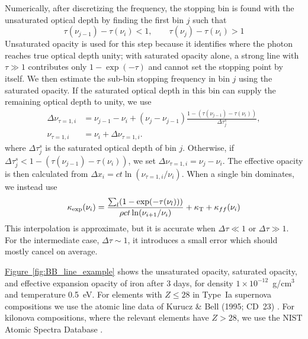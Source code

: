 \documentclass[final,5p,times,twocolumn]{elsarticle}
\DeclareRobustCommand{\figref}[1]{\hyperref[#1]{Figure~\ref*{#1}}}
\begin{document}
    Numerically, after discretizing the frequency, the stopping bin is found with the unsaturated
    optical depth by finding the first bin $j$ such that
    \begin{equation}
        \tau(\nu_{j-1}) - \tau(\nu_i) < 1,
        \qquad
        \tau(\nu_j) - \tau(\nu_i) > 1
    \end{equation}
    Unsaturated opacity is used for this step because it identifies where the photon reaches true
    optical depth unity; with saturated opacity alone, a strong line with $\tau \gg 1$ contributes
    only $1-\exp(-\tau)$ and cannot set the stopping point by itself.
    We then estimate the sub-bin stopping frequency in bin $j$ using the saturated opacity. If the
    saturated optical depth in this bin can supply the remaining optical depth to unity, we use
    \begin{equation}
        \begin{aligned}
        \Delta\nu_{\tau=1,i} &= \nu_{j-1} - \nu_i + (\nu_j - \nu_{j-1})
        \frac{1 - (\tau(\nu_{j-1})-\tau(\nu_i))}{\Delta\tau^{s}_j},\\
        \nu_{\tau=1,i} &= \nu_i + \Delta\nu_{\tau=1,i}.
        \end{aligned}
    \end{equation}
    where $\Delta\tau^{s}_j$ is the saturated optical depth of bin $j$. Otherwise, if
    $\Delta\tau^{s}_j < 1 - (\tau(\nu_{j-1})-\tau(\nu_i))$, we set
    $\Delta\nu_{\tau=1,i}=\nu_j-\nu_i$.
    The effective opacity is then calculated from $\Delta x_i = ct\ln(\nu_{\tau=1,i}/\nu_i)$. When a
    single bin dominates, we instead use
    \begin{equation}
        \label{eq:kappa_eff}
        \kappa_{\rm exp}(\nu_i) = \frac{ \sum_l (1 - \exp(-\tau(\nu_l)))}{\rho ct \ln(\nu_{i+1}/\nu_i)} + \kappa_{\mathrm{T}} + \kappa_{ff}(\nu_i)
    \end{equation}
    This interpolation is approximate, but it is accurate when
    $\Delta\tau \ll 1$ or $\Delta\tau \gg 1$. For the intermediate case, $\Delta\tau \sim 1$, it
    introduces a small error which should mostly cancel on average.

    \figref{fig:BB_line_example} shows the unsaturated opacity, saturated opacity, and effective
    expansion opacity of iron after 3 days, for density $1 \times 10^{-12}$~g/cm$^3$ and temperature
    0.5~eV.
    For elements with $Z\leq28$ in Type~Ia supernova compositions we use the atomic line data of Kurucz \& Bell
    (1995; CD~23) \cite{kurucz1995}. For kilonova compositions, where the relevant elements have $Z>28$,
    we use the NIST Atomic Spectra Database \cite{nistASD}.
\end{document}
